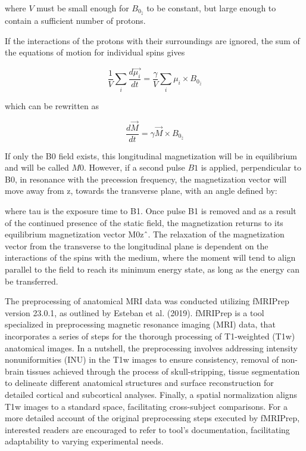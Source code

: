 \documentclass{cys}
\begin{document}
where $V$ must be small enough for $B_{0_{\hat{z}}}$ to be constant, but large enough to contain a sufficient number of protons.

\bigskip
If the interactions of the protons with their surroundings are ignored, the sum of the equations of motion for individual spins gives

\begin{equation}
\frac{1}{V}\sum_i \frac{d\vec{\mu_i}}{dt} = \frac{\gamma}{V}\sum_i \mu_i \times B_{0_{\hat{z}} }
\end{equation}

which can be rewritten as

\begin{equation}
\frac{d\vec{M}}{dt} = \gamma \vec{M} \times B_{0_{\hat{z}}}
\end{equation}

If only the B0 field exists, this longitudinal magnetization will be in equilibrium and will be called $M0$. However, if a second pulse $B1$ is applied, perpendicular to B0, in resonance with the precession frequency, the magnetization vector will move away from z, towards the transverse plane, with an angle defined by:

where tau is the exposure time to B1. Once pulse B1 is removed and as a result of the continued presence of the static field, the magnetization returns to its equilibrium magnetization vector M0zˆ. The relaxation of the magnetization vector from the transverse to the longitudinal plane is dependent on the interactions of the spins with the medium, where the moment will tend to align parallel to the field to reach its minimum energy state, as long as the energy can be transferred.



The preprocessing of anatomical MRI data was conducted utilizing fMRIPrep version 23.0.1, as outlined by Esteban et al. (2019). fMRIPrep is a tool specialized in preprocessing magnetic resonance imaging (MRI) data, that incorporates a series of steps for the thorough processing of T1-weighted (T1w) anatomical images. In a nutshell, the preprocessing involves addressing intensity nonuniformities (INU) in the T1w images to ensure consistency, removal of non-brain tissues achieved through the process of skull-stripping, tissue segmentation to delineate different anatomical structures and surface reconstruction for detailed cortical and subcortical analyses. Finally, a spatial normalization aligns T1w images to a standard space, facilitating cross-subject comparisons. For a more detailed account of the original preprocessing steps executed by fMRIPrep, interested readers are encouraged to refer to tool's documentation, facilitating adaptability to varying experimental needs.
\end{document}
